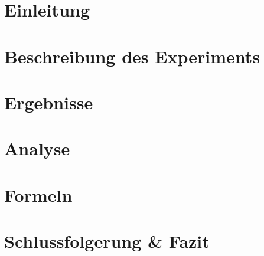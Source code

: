 \documentclass[11pt,twoside,a4paper,titlepage]{article}
\title{\titleText}
\author{\authorText}
\date{\dateText}
\begin{document}
	\maketitle
	\tableofcontents

    \section{Einleitung}
    
    	
    
    \section{Beschreibung des Experiments}

	
    
    \section{Ergebnisse}

	
    
    \section{Analyse}

	

    \section{Formeln}
	
	
    
    \section{Schlussfolgerung \& Fazit}
    
\end{document}
